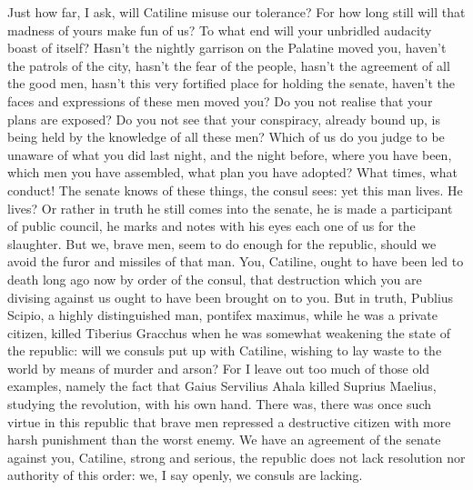 \documentclass[a4paper]{article}
\begin{document}
\begin{pairs}
\begin{Leftside}
    \pend
    \endnumbering
  \end{Leftside}
  \begin{Rightside}
    \beginnumbering
    \pstart
    Just how far, I ask, will Catiline misuse our tolerance? For how long still will that madness of yours make fun of us? To what end will your unbridled audacity boast of itself? Hasn’t the nightly garrison on the Palatine moved you, haven’t the patrols of the city, hasn’t the fear of the people, hasn’t the agreement of all the good men, hasn’t this very fortified place for holding the senate, haven’t the faces and expressions of these men moved you? Do you not realise that your plans are exposed? Do you not see that your conspiracy, already bound up, is being held by the knowledge of all these men? Which of us do you judge to be unaware of what you did last night, and the night before, where you have been, which men you have assembled, what plan you have adopted?
    \pend
    \pstart
    What times, what conduct! The senate knows of these things, the consul sees: yet this man lives. He lives? Or rather in truth he still comes into the senate, he is made a participant of public council, he marks and notes with his eyes each one of us for the slaughter. But we, brave men, seem to do enough for the republic, should we avoid the furor and missiles of that man. You, Catiline, ought to have been led to death long ago now by order of the consul, that destruction which you are divising against us ought to have been brought on to you.
    \pend
    \pstart
    But in truth, Publius Scipio, a highly distinguished man, pontifex maximus, while he was a private citizen, killed Tiberius Gracchus when he was somewhat weakening the state of the republic: will we consuls put up with Catiline, wishing to lay waste to the world by means of murder and arson? For I leave out too much of those old examples, namely the fact that Gaius Servilius Ahala killed Suprius Maelius, studying the revolution, with his own hand. There was, there was once such virtue in this republic that brave men repressed a destructive citizen with more harsh punishment than the worst enemy. We have an agreement of the senate against you, Catiline, strong and serious, the republic does not lack resolution nor authority of this order: we, I say openly, we consuls are lacking.
    \pend
    \endnumbering
  \end{Rightside}
\end{pairs}
\Columns
\newpage
\end{document}

